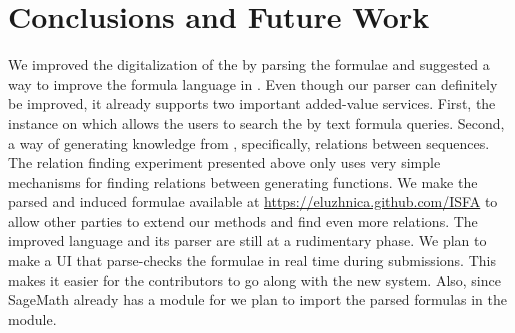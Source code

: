 \section{Conclusions and Future Work}\label{sec:Future}

We improved the digitalization of the \oeis by parsing the formulae and suggested a way to
improve the formula language in \oeis. Even though our parser can definitely be improved,
it already supports two important added-value services. First, the \mws instance on \oeis
which allows the users to search the \oeis by text formula queries. Second, a way of
generating knowledge from \oeis, specifically, relations between sequences. The relation
finding experiment presented above only uses very simple mechanisms for finding relations
between generating functions. We make the parsed and induced formulae available at
\url{https://eluzhnica.github.com/ISFA} to allow other parties to extend our methods and
find even more relations.  The improved language and its parser are still at a rudimentary
phase. We plan to make a UI that parse-checks the formulae in real time during
submissions. This makes it easier for the contributors to go along with the new
system. Also, since SageMath already has a module for \oeis we plan to import the parsed
formulas in the module.




